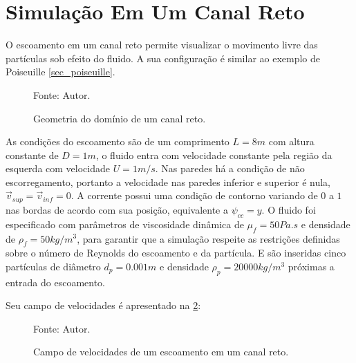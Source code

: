 \section{\textbf{Simulação Em Um Canal Reto}}
\label{sec_channel}
O escoamento em um canal reto permite visualizar o movimento livre das partículas sob efeito do fluido.
A sua configuração é similar ao exemplo de Poiseuille \ref{sec_poiseuille}.

\begin{figure}[H]
    \centering
     {\raggedleft \scriptsize Fonte: Autor.}
    \caption{Geometria do domínio de um canal reto.}
    \label{channel_geometry}
\end{figure}

As condições do escoamento são de um comprimento $L=8m$ com altura constante de $D=1m$, o fluido entra com velocidade constante pela região da esquerda com velocidade $U=1m/s$. %
Nas paredes há a condição de não escorregamento, portanto a velocidade nas paredes inferior e superior é nula, $\vec{v}_{sup}=\vec{v}_{inf}=0$.
A corrente possui uma condição de contorno variando de $0$ a $1$ nas bordas de acordo com sua posição, equivalente a $\psi_{cc}=y$.
O fluido foi especificado com parâmetros de viscosidade dinâmica de $\mu_f=50Pa.s$ e densidade de $\rho_f=50kg/m^3$, para garantir que a simulação respeite as restrições definidas sobre o número de Reynolds do escoamento e da partícula.
E são inseridas cinco partículas de diâmetro $d_p=0.001m$ e densidade $\rho_p=20000kg/m^3$ próximas a entrada do escoamento.

Seu campo de velocidades é apresentado na \ref{channel_result}:
\begin{figure}[H]
    \centering
     {\raggedleft \scriptsize Fonte: Autor.}
    \caption{Campo de velocidades de um escoamento em um canal reto.}
    \label{channel_result}
\end{figure}

